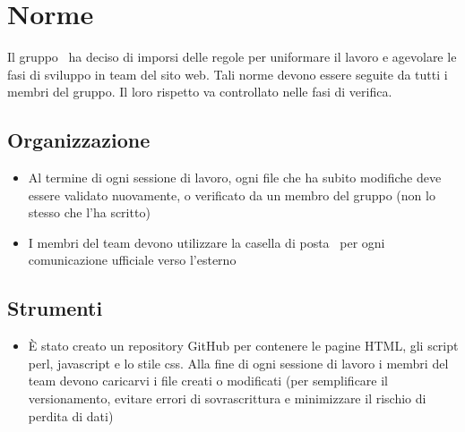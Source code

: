 \section{Norme}
Il gruppo \GRUPPO\ ha deciso di imporsi delle regole per uniformare il lavoro e agevolare le fasi di sviluppo in team del sito web. Tali norme devono essere seguite da tutti i membri del gruppo. Il loro rispetto va controllato nelle fasi di verifica.

\subsection{Organizzazione}
\begin{itemize}
	\item Al termine di ogni sessione di lavoro, ogni file che ha subito modifiche deve essere validato nuovamente, o verificato da un membro del gruppo (non lo stesso che l'ha scritto)
	
	\item I membri del team devono utilizzare la casella di posta \EMAIL\ per ogni comunicazione ufficiale verso l'esterno
\end{itemize}

\subsection{Strumenti}
\begin{itemize}
	\item È stato creato un repository GitHub per contenere le pagine HTML, gli script perl, javascript e lo stile css. Alla fine di ogni sessione di lavoro i membri del team devono caricarvi i file creati o modificati (per semplificare il versionamento, evitare errori di sovrascrittura e minimizzare il rischio di perdita di dati)
\end{itemize}

